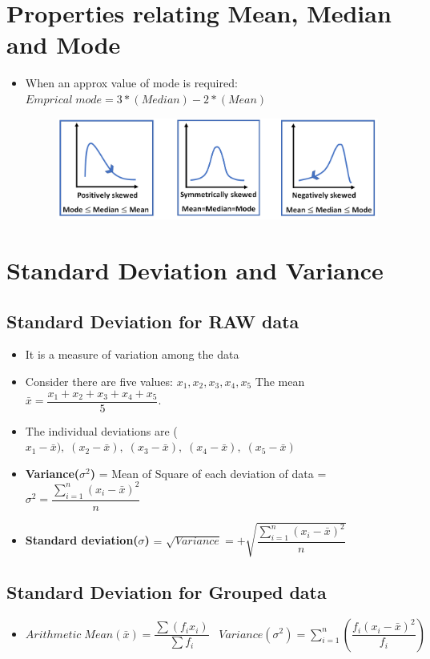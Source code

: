 \documentclass[8pt]{report}
\begin{document}
	\section{Properties relating Mean, Median and Mode}
		\begin{itemize}
			\item When an approx value of mode is required: $\boxed{Emprical\;mode = 3*(Median)-2*(Mean)}$
			\begin{figure}[H]
				\centering
				\includegraphics[scale=0.4]{MeanMedianModeRelation.png}
			\end{figure}
		\end{itemize}\hrulefill
	\section{Standard Deviation and Variance}
	\subsection{Standard Deviation for RAW data}
		\begin{itemize}
			\item It is a measure of variation among the data
			\item Consider there are five values: $x_1,x_2,x_3,x_4,x_5$ The mean $\bar{x} = \dfrac{x_1+x_2+x_3+x_4+x_5}{5}$.
			\item The individual deviations are ($x_1-\bar{x}),\;(x_2-\bar{x}),\;(x_3-\bar{x}),\;(x_4-\bar{x}),\;(x_5-\bar{x})$
			\item \textbf{Variance($\sigma^2$)} = Mean of Square of each deviation of data = $\boxed{\sigma^2 = \dfrac{\sum _{i=1}^n(x_i-\bar{x})^2}{n}}$
			\item \textbf{Standard deviation($\sigma$)} = $\boxed{\sqrt{Variance} = +\sqrt{\dfrac{\sum _{i=1}^n(x_i-\bar{x})^2}{n}}}$
		\end{itemize}\hrulefill
	\subsection{Standard Deviation for Grouped data}
		\begin{itemize}
			\item $\boxed{Arithmetic\;Mean(\bar{x})=\dfrac{\sum (f_ix_i)}{\sum f_i}}\;\;\;\boxed{Variance(\sigma^2) =\sum _{i=1}^{n}\left(\dfrac{f_i(x_i - \bar{x})^2}{f_i}\right)}$ 
		\end{itemize}\hrulefill
\end{document}

